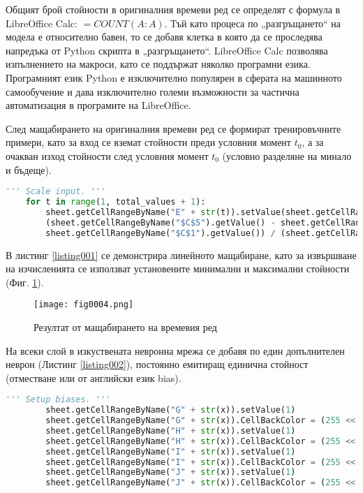 Общият брой стойности в оригиналния времеви ред се определят с формула в LibreOffice Calc: $=COUNT(A:A)$. Тъй като процеса по „разгръщането“ на модела е относително бавен, то се добавя клетка в която да се проследява напредъка от Python скрипта в „разгръщането“. LibreOffice Calc позволява изпълнението на макроси, като се поддържат няколко програмни езика. Програмният език Python е изключително популярен в сферата на машинното самообучение и дава изключително големи възможности за частична автоматизация в програмите на LibreOffice.

След мащабирането на оригиналния времеви ред се формират тренировъчните примери, като за вход се вземат стойности преди условния момент $t_0$, а за очакван изход стойности след условния момент $t_0$ (условно разделяне на минало и бъдеще).

\begin{lstlisting}[caption=Мащабиране на оригиналния времеви ред, language=Python, basicstyle=\tiny, label=listing001]
    ''' Scale input. '''
    for t in range(1, total_values + 1):
        sheet.getCellRangeByName("E" + str(t)).setValue(sheet.getCellRangeByName("$C$4").getValue() + 
        (sheet.getCellRangeByName("$C$5").getValue() - sheet.getCellRangeByName("$C$4").getValue()) * ((sheet.getCellRangeByName("A" + str(t)).getValue() - 
        sheet.getCellRangeByName("$C$1").getValue()) / (sheet.getCellRangeByName("$C$2").getValue() - sheet.getCellRangeByName("$C$1").getValue())))
\end{lstlisting}

В листинг \ref{listing001} се демонстрира линейното мащабиране, като за извършване на изчисленията се използват установените минимални и максимални стойности (Фиг. \ref{fig004}). 

\begin{figure}[H]
  \centering
  \texttt{[image: fig0004.png]}
  \caption{Резултат от мащабирането на времевия ред}
\label{fig004}
\end{figure}

На всеки слой в изкуствената невронна мрежа се добавя по един допълнителен неврон (Листинг \ref{listing002}), постоянно емитиращ единична стойност (отместване или от английски език bias).

\begin{lstlisting}[caption=Неврони емитиращи постоянно единичен сигнал, language=Python, basicstyle=\tiny, label=listing002]
        ''' Setup biases. '''
        sheet.getCellRangeByName("G" + str(x)).setValue(1)
        sheet.getCellRangeByName("G" + str(x)).CellBackColor = (255 << 16 | 255 << 8 | 0)
        sheet.getCellRangeByName("H" + str(x)).setValue(1)
        sheet.getCellRangeByName("H" + str(x)).CellBackColor = (255 << 16 | 255 << 8 | 0)
        sheet.getCellRangeByName("I" + str(x)).setValue(1)
        sheet.getCellRangeByName("I" + str(x)).CellBackColor = (255 << 16 | 255 << 8 | 0)
        sheet.getCellRangeByName("J" + str(x)).setValue(1)
        sheet.getCellRangeByName("J" + str(x)).CellBackColor = (255 << 16 | 255 << 8 | 0)
\end{lstlisting}

